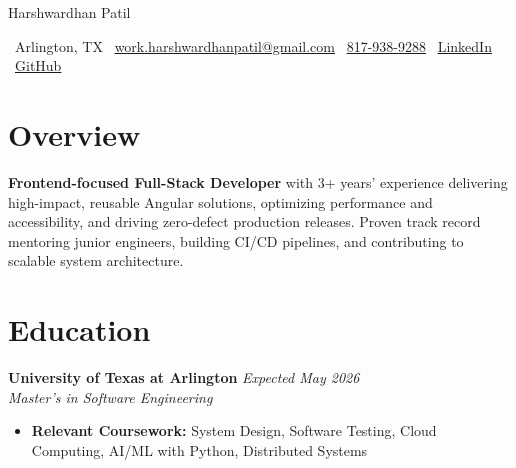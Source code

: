 \documentclass[10pt, letterpaper]{article}
\newenvironment{highlights}{\begin{itemize}[topsep=0.10 cm, parsep=0.10 cm, partopsep=0pt, itemsep=2pt, leftmargin=10pt]}{\end{itemize}}
\begin{document}
\newcommand{\AND}{\unskip\cleaders\copy\ANDbox\hskip\wd\ANDbox\ignorespaces}
\newsavebox\ANDbox
\sbox\ANDbox{$|$}

\begin{center}
    {\fontsize{25 pt}{25 pt}\selectfont Harshwardhan Patil}

    \vspace{5 pt}
    \normalsize
    \faMapMarker*\ Arlington, TX\hspace{1.5em}
    \faEnvelope\ \href{mailto:work.harshwardhanpatil@gmail.com}{work.harshwardhanpatil@gmail.com}\hspace{1.5em}
    \faPhone\ \href{tel:8179389288}{817-938-9288}\hspace{1.5em}
    \faLinkedin\ \href{https://www.linkedin.com/in/harshwardhanpatil23/}{LinkedIn}\hspace{1.5em}
    \faGithub\ \href{https://github.com/buffden}{GitHub}
\end{center}

\vspace{0.3 cm}
\newcommand{\educationentry}[4]{%
  \noindent\textbf{#1} \hfill \textit{#2}\\
  \textit{#3} \\
  #4
}
\section{Overview}
    \textbf{Frontend-focused Full-Stack Developer} with 3+ years’ experience delivering high-impact, reusable Angular solutions, optimizing performance and accessibility, and driving zero-defect production releases. Proven track record mentoring junior engineers, building CI/CD pipelines, and contributing to scalable system architecture.

\section{Education}
\educationentry
    {University of Texas at Arlington}
    {Expected May 2026}
    {Master’s in Software Engineering}
    {
    \begin{highlights}
        \item \textbf{Relevant Coursework:} System Design, Software Testing, Cloud Computing, AI/ML with Python, Distributed Systems
        \end{highlights}
    }
    
\end{document}
